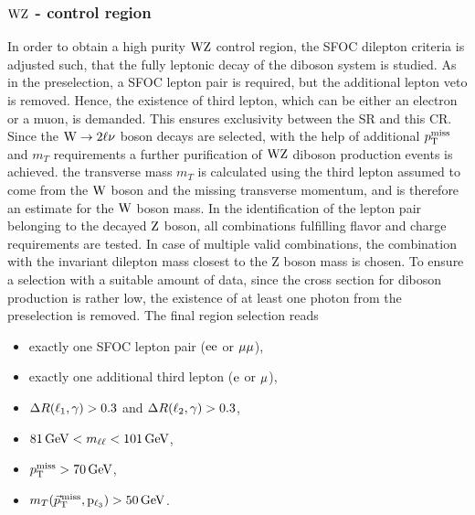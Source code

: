 \subsubsection*{$\mathrm{W}\mathrm{Z}$ - control region}
In order to obtain a high purity $\mathrm{W}\mathrm{Z}$ control region, the SFOC dilepton criteria is adjusted such, that the fully leptonic decay of the diboson system is studied. As in the preselection, a SFOC lepton pair is required, but the additional lepton veto is removed. Hence, the existence of third lepton, which can be either an electron or a muon, is demanded. This ensures exclusivity between the SR and this CR. Since the $\mathrm{W}\to2\ell\nu$ boson decays are selected, with the help of additional $p_{\mathrm{T}}^\text{miss}$ and $m_{T}$ requirements a further purification of $\mathrm{W}\mathrm{Z}$ diboson production events is achieved. the transverse mass $m_{T}$ is calculated using the third lepton assumed to come from the $\mathrm{W}$ boson and the missing transverse momentum, and is therefore an estimate for the $\mathrm{W}$ boson mass. In the identification of the lepton pair belonging to the decayed $\mathrm{Z}$ boson, all combinations fulfilling flavor and charge requirements are tested. In case of multiple valid combinations, the combination with the invariant dilepton mass closest to the Z boson mass is chosen. To ensure a selection with a suitable amount of data, since the cross section for diboson production is rather low, the existence of at least one photon from the preselection is removed. The final region selection reads
\begin{itemize}
 \item exactly one SFOC lepton pair ($\mathrm{e}\mathrm{e}$ or $\mu\mu$),
 \item exactly one additional third lepton ($\mathrm{e}$ or ${\mu}$),
 \item $\Delta R(\ell_1,\gamma)>0.3$ and $\Delta R(\ell_2,\gamma)>0.3$,
 \item $81\,\text{Ge\hspace{-.08em}V}<m_{\ell\ell}<101\,\text{Ge\hspace{-.08em}V}$,
 \item $p_{\mathrm{T}}^\text{miss}>70\,\text{Ge\hspace{-.08em}V}$,
 \item $m_{T}({\vec p}_{\mathrm{T}}^{\kern1pt\text{miss}},\mathrm{p_{\ell_3}})>50\,\text{Ge\hspace{-.08em}V}$.
\end{itemize}
